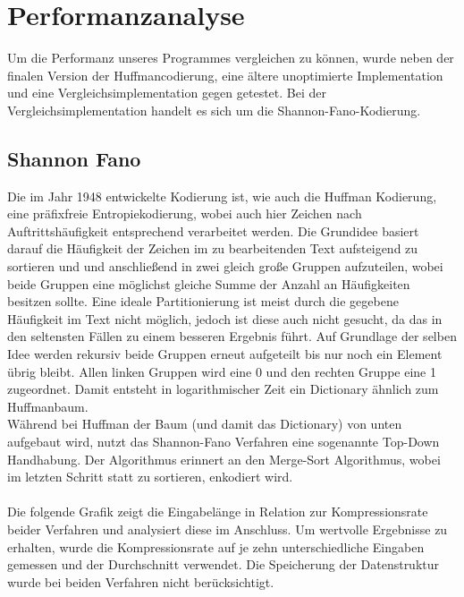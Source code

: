 \documentclass[course=erap]{aspdoc}
\begin{document}
\section{Performanzanalyse}

Um die Performanz unseres Programmes vergleichen zu können, wurde neben der finalen Version der Huffmancodierung, eine ältere unoptimierte Implementation und eine Vergleichsimplementation gegen getestet. Bei der Vergleichsimplementation handelt es sich um die Shannon-Fano-Kodierung.%
\subsection{Shannon Fano}
Die im Jahr 1948 entwickelte Kodierung ist, wie auch die Huffman Kodierung, eine präfixfreie Entropiekodierung, wobei auch hier Zeichen nach Auftrittshäufigkeit entsprechend verarbeitet werden. Die Grundidee basiert darauf die Häufigkeit der Zeichen im zu bearbeitenden Text aufsteigend zu sortieren und und anschließend in zwei gleich große Gruppen aufzuteilen, wobei beide Gruppen eine möglichst gleiche Summe der Anzahl an Häufigkeiten besitzen sollte. Eine ideale Partitionierung ist meist durch die gegebene Häufigkeit im Text nicht möglich, jedoch ist diese auch nicht gesucht, da das in den seltensten Fällen zu einem besseren Ergebnis führt. Auf Grundlage der selben Idee werden rekursiv beide Gruppen erneut aufgeteilt bis nur noch ein Element übrig bleibt. Allen linken Gruppen wird eine 0 und den rechten Gruppe eine 1 zugeordnet. Damit entsteht in logarithmischer Zeit ein Dictionary ähnlich zum Huffmanbaum.\\
Während bei Huffman der Baum (und damit das Dictionary) von unten aufgebaut wird, nutzt das Shannon-Fano Verfahren eine sogenannte Top-Down Handhabung. Der Algorithmus erinnert an den Merge-Sort Algorithmus, wobei im letzten Schritt statt zu sortieren, enkodiert wird.\\\\
Die folgende Grafik zeigt die Eingabelänge in Relation zur Kompressionsrate beider Verfahren und analysiert diese im Anschluss. Um wertvolle Ergebnisse zu erhalten, wurde die Kompressionsrate auf je zehn unterschiedliche Eingaben gemessen und der Durchschnitt verwendet. Die Speicherung der Datenstruktur wurde bei beiden Verfahren nicht berücksichtigt.\\
\end{document}
